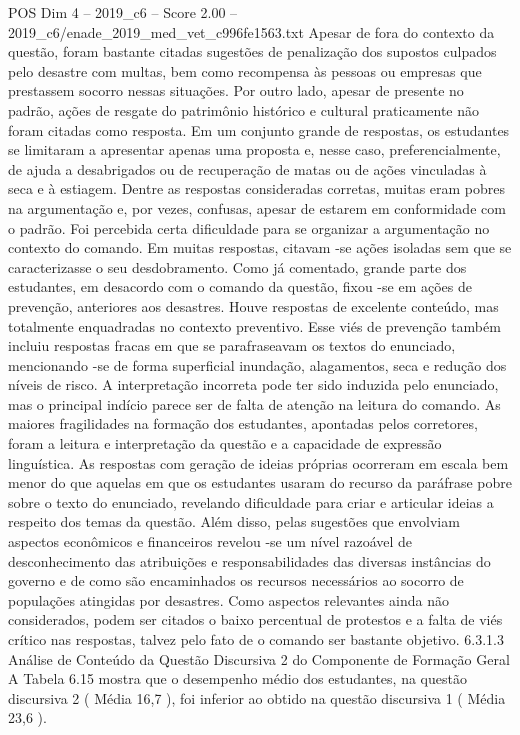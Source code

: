 \begin{textsample}{POS Dim 4 – 2019\_c6 – Score 2.00 – 2019\_c6/enade\_2019\_med\_vet\_c996fe1563.txt}
Apesar de fora do contexto da questão, foram bastante citadas sugestões de penalização dos supostos culpados pelo desastre com multas, bem como recompensa às pessoas ou empresas que prestassem socorro nessas situações.
Por outro lado, apesar de presente no padrão, ações de resgate do patrimônio histórico e cultural praticamente não foram citadas como resposta.
Em um conjunto grande de respostas, os estudantes se limitaram a apresentar apenas uma proposta e, nesse caso, preferencialmente, de ajuda a desabrigados ou de recuperação de matas ou de ações vinculadas à seca e à estiagem.
Dentre as respostas consideradas corretas, muitas eram pobres na argumentação e, por vezes, confusas, apesar de estarem em conformidade com o padrão.
Foi percebida certa dificuldade para se organizar a argumentação no contexto do comando.
Em muitas respostas, citavam -se ações isoladas sem que se caracterizasse o seu desdobramento.
Como já comentado, grande parte dos estudantes, em desacordo com o comando da questão, fixou -se em ações de prevenção, anteriores aos desastres.
Houve respostas de excelente conteúdo, mas totalmente enquadradas no contexto preventivo.
Esse viés de prevenção também incluiu respostas fracas em que se parafraseavam os textos do enunciado, mencionando -se de forma superficial inundação, alagamentos, seca e redução dos níveis de risco.
A interpretação incorreta pode ter sido induzida pelo enunciado, mas o principal indício parece ser de falta de atenção na leitura do comando.
As maiores fragilidades na formação dos estudantes, apontadas pelos corretores, foram a leitura e interpretação da questão e a capacidade de expressão linguística.
As respostas com geração de ideias próprias ocorreram em escala bem menor do que aquelas em que os estudantes usaram do recurso da paráfrase pobre sobre o texto do enunciado, revelando dificuldade para criar e articular ideias a respeito dos temas da questão.
Além disso, pelas sugestões que envolviam aspectos econômicos e financeiros revelou -se um nível razoável de desconhecimento das atribuições e responsabilidades das diversas instâncias do governo e de como são encaminhados os recursos necessários ao socorro de populações atingidas por desastres.
Como aspectos relevantes ainda não considerados, podem ser citados o baixo percentual de protestos e a falta de viés crítico nas respostas, talvez pelo fato de o comando ser bastante objetivo. 6.3.1.3 Análise de Conteúdo da Questão Discursiva 2 do Componente de Formação Geral A Tabela 6.15 mostra que o desempenho médio dos estudantes, na questão discursiva 2 ( Média 16,7 ), foi inferior ao obtido na questão discursiva 1 ( Média 23,6 ).

\end{textsample}
